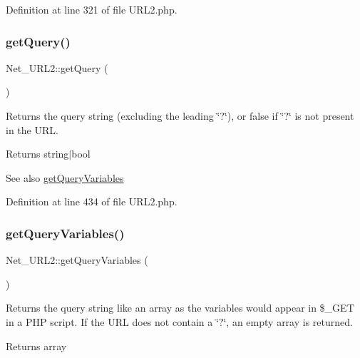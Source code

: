 Definition at line 321 of file U\+R\+L2.\+php.

\hypertarget{classNet__URL2_ab65997a75dae3ef237c80b57da4467f6}{}\label{classNet__URL2_ab65997a75dae3ef237c80b57da4467f6} 
\subsubsection{\texorpdfstring{get\+Query()}{getQuery()}}
{\footnotesize\ttfamily Net\+\_\+\+U\+R\+L2\+::get\+Query (\begin{DoxyParamCaption}{ }\end{DoxyParamCaption})}

Returns the query string (excluding the leading \char`\"{}?\char`\"{}), or false if \char`\"{}?\char`\"{} is not present in the U\+RL.

\begin{DoxyReturn}{Returns}
string$\vert$bool 
\end{DoxyReturn}
\begin{DoxySeeAlso}{See also}
\hyperlink{classNet__URL2_a92231f88e82f0551c1958af40f7cb88d}{get\+Query\+Variables} 
\end{DoxySeeAlso}


Definition at line 434 of file U\+R\+L2.\+php.

\hypertarget{classNet__URL2_a92231f88e82f0551c1958af40f7cb88d}{}\label{classNet__URL2_a92231f88e82f0551c1958af40f7cb88d} 
\subsubsection{\texorpdfstring{get\+Query\+Variables()}{getQueryVariables()}}
{\footnotesize\ttfamily Net\+\_\+\+U\+R\+L2\+::get\+Query\+Variables (\begin{DoxyParamCaption}{ }\end{DoxyParamCaption})}

Returns the query string like an array as the variables would appear in \$\+\_\+\+G\+ET in a P\+HP script. If the U\+RL does not contain a \char`\"{}?\char`\"{}, an empty array is returned.

\begin{DoxyReturn}{Returns}
array 
\end{DoxyReturn}


